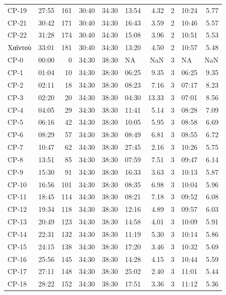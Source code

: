 \documentclass[]{elsarticle} %
\begin{document}
\begin{longtable}[t]{llrlllrllr}
CP-19 & 27:55 & 161 & 30:40 & 34:30 & 13:54 & 4.32 & 2 & 10:24 & 5.77\\
CP-21 & 30:42 & 171 & 30:40 & 34:30 & 16:43 & 3.59 & 2 & 10:46 & 5.57\\
CP-22 & 31:28 & 174 & 30:40 & 34:30 & 15:08 & 3.96 & 2 & 10:51 & 5.53\\
Χαϊντού & 33:01 & 181 & 30:40 & 34:30 & 13:20 & 4.50 & 2 & 10:57 & 5.48\\
\addlinespace
CP-0 & 00:00 & 0 & 34:30 & 38:30 & NA & NaN & 3 & NA & NaN\\
CP-1 & 01:04 & 10 & 34:30 & 38:30 & 06:25 & 9.35 & 3 & 06:25 & 9.35\\
CP-2 & 02:11 & 18 & 34:30 & 38:30 & 08:23 & 7.16 & 3 & 07:17 & 8.23\\
CP-3 & 02:20 & 20 & 34:30 & 38:30 & 04:30 & 13.33 & 3 & 07:01 & 8.56\\
CP-4 & 04:05 & 29 & 34:30 & 38:30 & 11:41 & 5.14 & 3 & 08:28 & 7.09\\
\addlinespace
CP-5 & 06:16 & 42 & 34:30 & 38:30 & 10:05 & 5.95 & 3 & 08:58 & 6.69\\
CP-6 & 08:29 & 57 & 34:30 & 38:30 & 08:49 & 6.81 & 3 & 08:55 & 6.72\\
CP-7 & 10:47 & 62 & 34:30 & 38:30 & 27:45 & 2.16 & 3 & 10:26 & 5.75\\
CP-8 & 13:51 & 85 & 34:30 & 38:30 & 07:59 & 7.51 & 3 & 09:47 & 6.14\\
CP-9 & 15:30 & 91 & 34:30 & 38:30 & 16:33 & 3.63 & 3 & 10:13 & 5.87\\
\addlinespace
CP-10 & 16:56 & 101 & 34:30 & 38:30 & 08:35 & 6.98 & 3 & 10:04 & 5.96\\
CP-11 & 18:45 & 114 & 34:30 & 38:30 & 08:21 & 7.18 & 3 & 09:52 & 6.08\\
CP-12 & 19:34 & 118 & 34:30 & 38:30 & 12:16 & 4.89 & 3 & 09:57 & 6.03\\
CP-13 & 20:49 & 123 & 34:30 & 38:30 & 14:58 & 4.01 & 3 & 10:09 & 5.91\\
CP-14 & 22:31 & 132 & 34:30 & 38:30 & 11:19 & 5.30 & 3 & 10:14 & 5.86\\
\addlinespace
CP-15 & 24:15 & 138 & 34:30 & 38:30 & 17:20 & 3.46 & 3 & 10:32 & 5.69\\
CP-16 & 25:56 & 145 & 34:30 & 38:30 & 14:28 & 4.15 & 3 & 10:44 & 5.59\\
CP-17 & 27:11 & 148 & 34:30 & 38:30 & 25:02 & 2.40 & 3 & 11:01 & 5.44\\
CP-18 & 28:22 & 152 & 34:30 & 38:30 & 17:51 & 3.36 & 3 & 11:12 & 5.36\\

\end{longtable}
\end{document}
